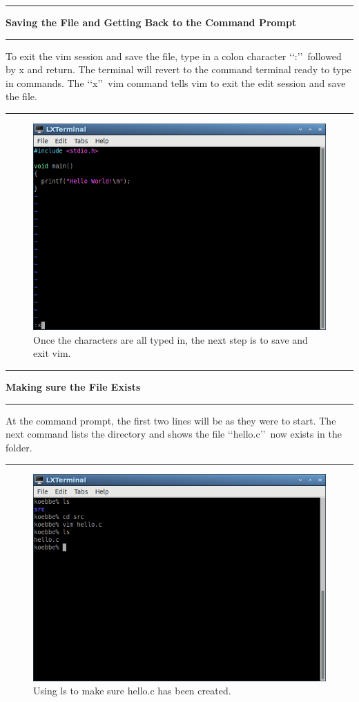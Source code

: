 \documentclass[10pt,fleqn]{article}
\begin{document}
\eject
\vskip0.1in\hrule\vskip0.1in
\noindent
{\bf Saving the File and Getting Back to the Command Prompt} 
\vskip0.1in\hrule\vskip0.1in
\noindent
To exit the vim session and save the file, type in a colon character
\lq\lq :\rq\rq\ followed by x and return. The terminal will revert to the
command terminal ready to type in commands. The \lq\lq x\rq\rq\ vim command
tells vim to exit the edit session and save the file.
\vskip0.1in\hrule\vskip0.1in
\vfill
\begin{figure}[h]
\centering
\includegraphics[width=5.0in]{../images/hello_world_05.png}
\caption{Once the characters are all typed in, the next step is to save and exit
         vim.}
\end{figure}
\eject
\vskip0.1in\hrule\vskip0.1in \noindent
{\bf Making sure the File Exists} 
\vskip0.1in\hrule\vskip0.1in \noindent
At the command prompt, the first two lines will be as they were to start. The
next command lists the directory and shows the file \lq\lq hello.c\rq\rq\ now
exists in the folder.
\vskip0.1in\hrule\vskip0.1in
\vfill
\begin{figure}[h]
\centering
\includegraphics[width=5.0in]{../images/hello_world_06.png}
\caption{Using ls to make sure hello.c has been created.}
\end{figure}
\end{document}
